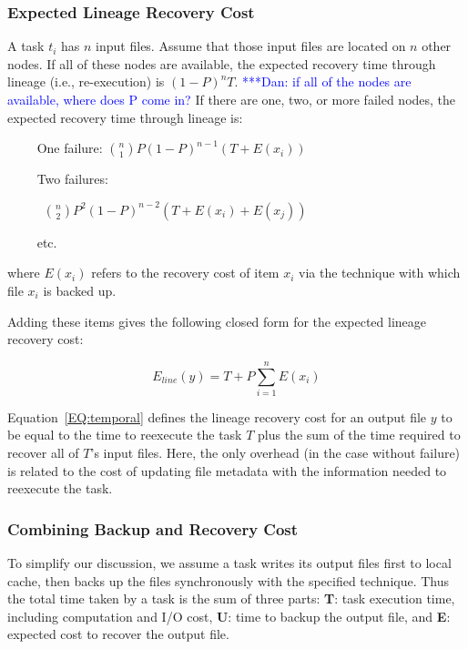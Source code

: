 \documentclass{sig-alternate}
\newcommand{\katznote}[1]{ {\textcolor{blue}    { ***Dan:      #1 }}}
\newcommand{\katznote}[1]{}
\begin{document}
\subsubsection{Expected Lineage Recovery Cost}
A task $t_i$ has $n$ input files. Assume that those input files are located on $n$ other nodes.
If all of these nodes are available, the expected recovery time through lineage (i.e., re-execution) is
$(1-P)^nT$. \katznote{if all of the nodes are available, where does P come in?}  If there are one, two, or more failed nodes, the expected recovery time through lineage is:

\noindent ~~~~ One failure:
%
${n \choose 1}P(1-P)^{n-1}(T+E(x_i))$

\noindent ~~~~ Two failures:

~~~~~ ${n \choose 2}P^2(1-P)^{n-2}(T+E(x_i)+E(x_j))$

\noindent ~~~~ etc.

\noindent where ${E(x_i)}$ refers to the recovery cost of item ${x_i}$ via the technique with which file ${x_i}$ is backed up. 


Adding these items gives the following closed form for the expected lineage recovery cost:

\begin{equation}
E_{line}(y) = T+P\sum_{i=1}^{n}E(x_i)
\label{EQ:temporal}
\end{equation}

Equation~\ref{EQ:temporal} defines the lineage recovery cost for an output file $y$ to be
equal to the time to reexecute the task $T$ plus the sum of the time required to recover all of $T$'s
input files. Here, the only overhead (in the case without failure) is related to 
the cost of updating file metadata with the information needed to reexecute the task.

\subsubsection{Combining Backup and Recovery Cost}
To simplify our discussion, we assume a task writes its output files first to local cache, then backs up the files synchronously with the specified technique. Thus the total time taken by a task is the sum of three parts:
{\bf T}: task execution time, including computation and I/O cost,
{\bf U}: time to backup the output file,
and {\bf E}: expected cost to recover the output file.
\end{document}
